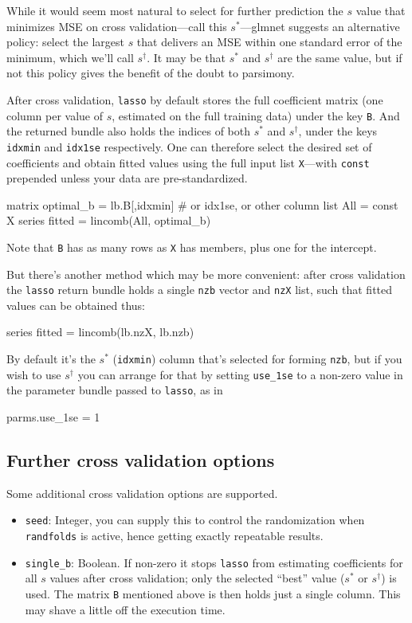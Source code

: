 \documentclass{article}
\begin{document}
While it would seem most natural to select for further prediction the
$s$ value that minimizes MSE on cross validation---call this
$s^*$---\textsf{glmnet} suggests an alternative policy: select the
largest $s$ that delivers an MSE within one standard error of the
minimum, which we'll call $s^{\dagger}$. It may be that $s^*$ and
$s^{\dagger}$ are the same value, but if not this policy gives the
benefit of the doubt to parsimony.

After cross validation, \texttt{lasso} by default stores the full
coefficient matrix (one column per value of $s$, estimated on the full
training data) under the key \texttt{B}.  And the returned bundle also
holds the indices of both $s^*$ and $s^{\dagger}$, under the keys
\texttt{idxmin} and \texttt{idx1se} respectively. One can therefore
select the desired set of coefficients and obtain fitted values using
the full input list \texttt{X}---with \texttt{const} prepended unless
your data are pre-standardized.
\begin{code}
matrix optimal_b = lb.B[,idxmin] # or idx1se, or other column
list All = const X
series fitted = lincomb(All, optimal_b)
\end{code}
Note that \texttt{B} has as many rows as \texttt{X} has members, plus
one for the intercept.

But there's another method which may be more convenient: after cross
validation the \texttt{lasso} return bundle holds a single
\texttt{nzb} vector and \texttt{nzX} list, such that fitted values can
be obtained thus:
\begin{code}
series fitted = lincomb(lb.nzX, lb.nzb)
\end{code}
By default it's the $s^*$ (\texttt{idxmin}) column that's selected for
forming \texttt{nzb}, but if you wish to use $s^{\dagger}$ you can
arrange for that by setting \texttt{use\_1se} to a non-zero value in
the parameter bundle passed to \texttt{lasso}, as in
\begin{code}
parms.use_1se = 1
\end{code}

\subsection*{Further cross validation options}

Some additional cross validation options are supported.

\begin{itemize}
\item \texttt{seed}: Integer, you can supply this to control the
  randomization when \texttt{randfolds} is active, hence getting
  exactly repeatable results.
\item \texttt{single\_b}: Boolean. If non-zero it stops \texttt{lasso}
  from estimating coefficients for all $s$ values after cross
  validation; only the selected ``best'' value ($s^*$ or
  $s^{\dagger}$) is used. The matrix \texttt{B} mentioned above is
  then holds just a single column. This may shave a little off the
  execution time.

\end{itemize}
\end{document}
